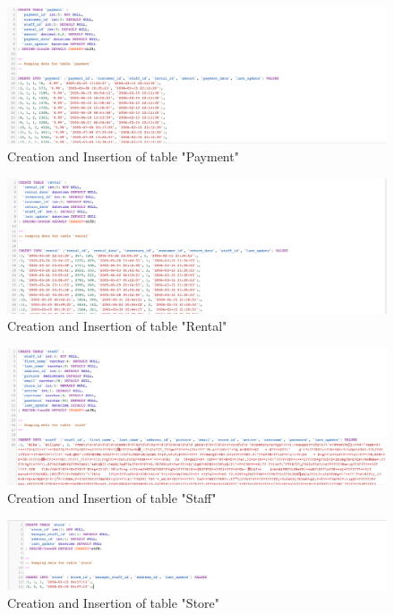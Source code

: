 \documentclass[openany]{article}
\begin{document}
	\begin{figure}[H]
		\includegraphics[width=\textwidth]{table_payment_cins}
		\caption{Creation and Insertion of table "Payment"}	
	\end{figure}
	\begin{figure}[H]
		\includegraphics[width=\textwidth]{table_rental_cins}
		\caption{Creation and Insertion of table "Rental"}	
	\end{figure}
	\begin{figure}[H]
		\includegraphics[width=\textwidth]{table_staff_cins}
		\caption{Creation and Insertion of table "Staff"}	
	\end{figure}
	\begin{figure}[H]
		\includegraphics[width=\textwidth]{table_store_cins}
		\caption{Creation and Insertion of table "Store"}	
	\end{figure}
\end{document}
